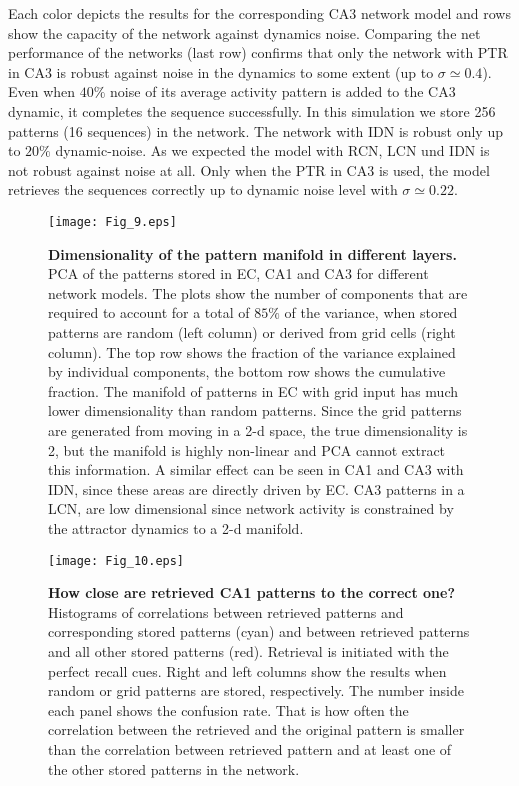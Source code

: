\documentclass[utf8]{frontiersSCNS} %
\begin{document}
Each color depicts the results for the corresponding CA3 network model and rows show the capacity of the network against dynamics noise.  
Comparing the net performance of the networks (last row) confirms that only the network with PTR in CA3 is robust against noise in the dynamics to some extent (up to $\sigma \simeq 0.4$). Even when $ 40 \% $ noise of its average activity pattern is added to the CA3 dynamic, it completes the sequence successfully. In this simulation we store 256 patterns (16 sequences) in the network. The network with IDN is robust only up to $ 20 \% $ dynamic-noise.
As we expected the model with RCN, LCN und IDN is not robust against noise at all. Only when the PTR in CA3 is used, the model retrieves the sequences correctly up to dynamic noise level with $\sigma \simeq 0.22$.
\begin{figure}[!htb]
\centering\texttt{[image: Fig\_9.eps]}
\caption{\textbf{Dimensionality of the pattern manifold in different layers.} PCA of the patterns stored in EC, CA1 and CA3 for different network models. The plots show the number of components that are required to account for a total of $85 \%$ of the variance, when stored patterns are random (left column) or derived from grid cells (right column). The top row shows the fraction of the variance explained by individual components, the bottom row shows the cumulative fraction. The manifold of patterns in EC with grid input has much lower dimensionality than random patterns. Since the grid patterns are generated from moving in a 2-d space, the true dimensionality is 2, but the manifold is highly non-linear and PCA cannot extract this information. A similar effect can be seen in CA1 and CA3 with IDN, since these areas are directly driven by EC. CA3 patterns in a LCN, are low dimensional since network activity is constrained by the attractor dynamics to a 2-d manifold.}
\label{Fig_9}
\end{figure}


\begin{figure}[!htb]
\centering\texttt{[image: Fig\_10.eps]}
\caption{\textbf{How close are retrieved CA1 patterns to the correct one?} Histograms of correlations between retrieved patterns and corresponding stored patterns (cyan) and between retrieved patterns and all other stored patterns (red). Retrieval is initiated with the perfect recall cues. Right and left columns show the results when random or grid patterns are stored, respectively. The number inside each panel shows the confusion rate. That is how often the correlation between the retrieved and the original pattern is smaller than the correlation between retrieved pattern and at least one of the other stored patterns in the network.} 
\label{Fig_10}
\end{figure}
\end{document}

